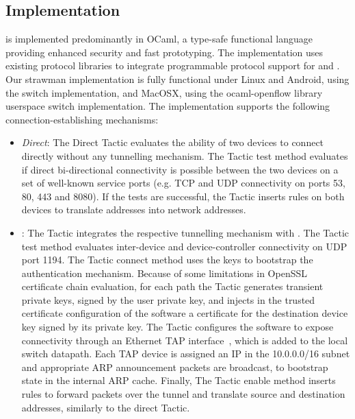 \subsection{\signpost Implementation} \label{sec:sp-implementation}

\signpost is implemented predominantly in OCaml, a type-safe functional
language providing enhanced security and fast prototyping.  The implementation
uses existing protocol libraries to integrate programmable protocol support for
\dnssec and \of. Our strawman implementation is fully functional under Linux
and Android, using the \ovs switch implementation, and MacOSX, using the
ocaml-openflow library userspace switch implementation. The \signpost
implementation supports  the following connection-establishing mechanisms: 

\begin{itemize}

    \item \emph{Direct}: The Direct Tactic evaluates the ability of  two devices
        to connect directly without any tunnelling mechanism. The Tactic test method
        evaluates if direct bi-directional connectivity is possible between the two
        devices on a set of well-known service ports (e.g. TCP and UDP connectivity
        on ports 53, 80, 443 and 8080). If the tests are successful, the Tactic
        inserts \of rules on both devices to translate \signpost addresses into
        network addresses. 

    \item \emph{\openvpn}: The \openvpn Tactic integrates the respective
        tunnelling mechanism with \signpost. The Tactic test method evaluates
        inter-device and device-\signpost controller connectivity on UDP port 1194.
        The Tactic connect method uses the \signpost keys to bootstrap the \openvpn
        authentication mechanism.  Because of some limitations in OpenSSL certificate
        chain evaluation, for each path the Tactic generates transient private keys,
        signed by the user private key, and injects in the trusted certificate
        configuration of the \openvpn software a certificate for the destination
        device key signed by its private key.  The Tactic configures the \openvpn
        software to expose connectivity through an Ethernet TAP
        interface~, which is added to the local switch datapath. Each
        TAP device is assigned an IP in the 10.0.0.0/16 subnet and appropriate ARP
        announcement packets are broadcast, to bootstrap state in the internal
        \openvpn ARP cache. Finally, The Tactic enable method inserts \of rules to
        forward packets over the \openvpn tunnel and translate source and destination
        addresses, similarly to the direct Tactic.


\end{itemize}
